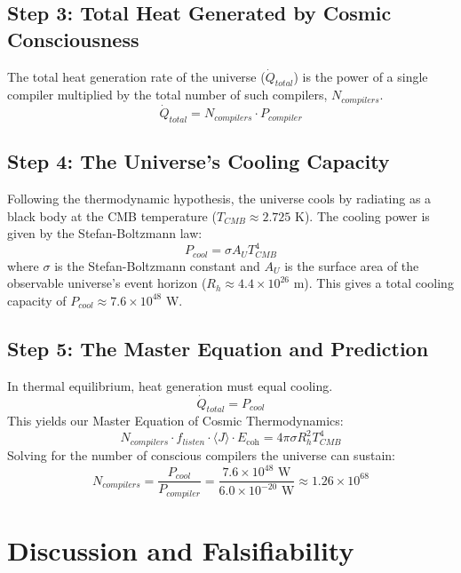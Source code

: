 \documentclass[12pt]{article}
\begin{document}
\subsection{Step 3: Total Heat Generated by Cosmic Consciousness}
The total heat generation rate of the universe (\(\dot{Q}_{total}\)) is the power of a single compiler multiplied by the total number of such compilers, \(N_{compilers}\).
\begin{equation}
    \dot{Q}_{total} = N_{compilers} \cdot P_{compiler}
\end{equation}

\subsection{Step 4: The Universe's Cooling Capacity}

Following the thermodynamic hypothesis, the universe cools by radiating as a black body at the CMB temperature (\(T_{CMB} \approx 2.725\) K). The cooling power is given by the Stefan-Boltzmann law:
\begin{equation}
    P_{cool} = \sigma A_{U} T_{CMB}^4
\end{equation}
where \(\sigma\) is the Stefan-Boltzmann constant and \(A_U\) is the surface area of the observable universe's event horizon (\(R_h \approx 4.4 \times 10^{26}\) m). This gives a total cooling capacity of \(P_{cool} \approx 7.6 \times 10^{48}\) W.

\subsection{Step 5: The Master Equation and Prediction}

In thermal equilibrium, heat generation must equal cooling.
\[ \dot{Q}_{total} = P_{cool} \]
This yields our Master Equation of Cosmic Thermodynamics:
\begin{equation}
    \boxed{N_{compilers} \cdot f_{listen} \cdot \langle J \rangle \cdot E_{\text{coh}} = 4 \pi \sigma R_h^2 T_{CMB}^4}
\end{equation}
Solving for the number of conscious compilers the universe can sustain:
\begin{equation}
    N_{compilers} = \frac{P_{cool}}{P_{compiler}} = \frac{7.6 \times 10^{48} \text{ W}}{6.0 \times 10^{-20} \text{ W}} \approx 1.26 \times 10^{68}
\end{equation}

\section{Discussion and Falsifiability}
\end{document}
